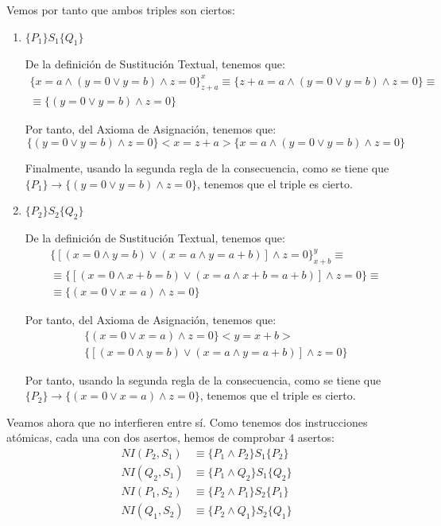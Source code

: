 \begin{ejercicio}
    Vemos por tanto que ambos triples son ciertos:
    \begin{enumerate}
        \item $\{P_1\} S_1 \{Q_1\}$
        
        De la definición de Sustitución Textual, tenemos que:
        \begin{multline*}
            \{x=a \land (y=0 \lor y=b) \land z = 0\}_{z+a}^x \equiv \{z+a=a \land (y=0 \lor y=b) \land z = 0\} \equiv\\\equiv \{(y=0 \lor y=b) \land z=0\}
        \end{multline*}

        Por tanto, del Axioma de Asignación, tenemos que:
        \begin{equation*}
            \{(y=0 \lor y=b) \land z = 0\} <x = z + a> \{x=a \land (y=0 \lor y=b) \land z = 0\}
        \end{equation*}

        Finalmente, usando la segunda regla de la consecuencia, como se tiene que $\{P_1\}\rightarrow\{(y=0 \lor y=b) \land z = 0\}$, tenemos que el triple es cierto.
        
        \item $\{P_2\} S_2 \{Q_2\}$
        
        De la definición de Sustitución Textual, tenemos que:
        \begin{multline*}
            \{[(x=0\land y=b) \lor (x=a\land y=a+b)] \land z=0\}_{x+b}^y \equiv \\ \equiv \{[(x=0\land x+b=b) \lor (x=a\land x+b=a+b)] \land z = 0\} \equiv \\ \equiv \{(x=0\lor x=a) \land z = 0\}
        \end{multline*}

        Por tanto, del Axioma de Asignación, tenemos que:
        \begin{multline*}
            \{(x=0\lor x=a) \land z = 0\} <y = x + b> \\ \{[(x=0\land y=b) \lor (x=a\land y=a+b)] \land z=0\}
        \end{multline*}

        Por tanto, usando la segunda regla de la consecuencia, como se tiene que $\{P_2\}\rightarrow\{(x=0\lor x=a) \land z = 0\}$, tenemos que el triple es cierto.
    \end{enumerate}

    Veamos ahora que no interfieren entre sí. Como tenemos dos instrucciones atómicas, cada una con dos asertos, hemos de comprobar $4$ asertos:
    \begin{align*}
        NI(P_2, S_1) & \equiv \{P_1\land P_2\} S_1 \{P_2\} \\
        NI(Q_2, S_1) & \equiv \{P_1\land Q_2\} S_1 \{Q_2\} \\
        NI(P_1, S_2) & \equiv \{P_2\land P_1\} S_2 \{P_1\} \\
        NI(Q_1, S_2) & \equiv \{P_2\land Q_1\} S_2 \{Q_1\}
    \end{align*}


\end{ejercicio}
